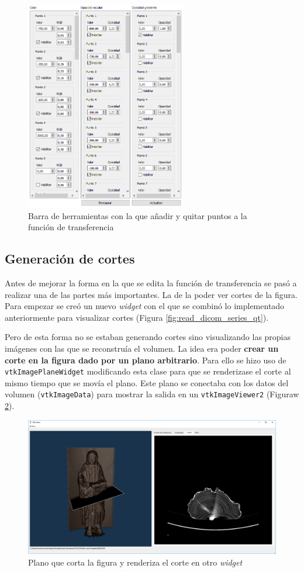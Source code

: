 \begin{figure}[H]
	\centering
	\includegraphics[width=7cm]{imagenes/gui_inicial_tf}
	\caption{Barra de herramientas con la que añadir y quitar puntos a la función de transferencia}
	\label{fig:gui_inicial_tf}
\end{figure}

\subsection{Generación de cortes}

Antes de mejorar la forma en la que se edita la función de transferencia se pasó a realizar una de las partes más importantes. La de la poder ver cortes de la figura. Para empezar se creó un nuevo \textit{widget} con el que se combinó lo implementado anteriormente para visualizar cortes (Figura \ref{fig:read_dicom_series_qt}). 

Pero de esta forma no se estaban generando cortes sino visualizando las propias imágenes con las que se reconstruía el volumen. La idea era poder \textbf{crear un corte en la figura dado por un plano arbitrario}. Para ello se hizo uso de \texttt{vtkImagePlaneWidget} modificando esta clase para que se renderizase el corte al mismo tiempo que se movía el plano. Este plano se conectaba con los datos del volumen (\texttt{vtkImageData}) para mostrar la salida en un \texttt{vtkImageViewer2} (Figuraw \ref{fig:primer_plano_de_corte}).

\begin{figure}[H]
	\centering
	\includegraphics[width=12cm]{imagenes/primer_plano_de_corte}
	\caption{Plano que corta la figura y renderiza el corte en otro \textit{widget}}
	\label{fig:primer_plano_de_corte}
\end{figure}


